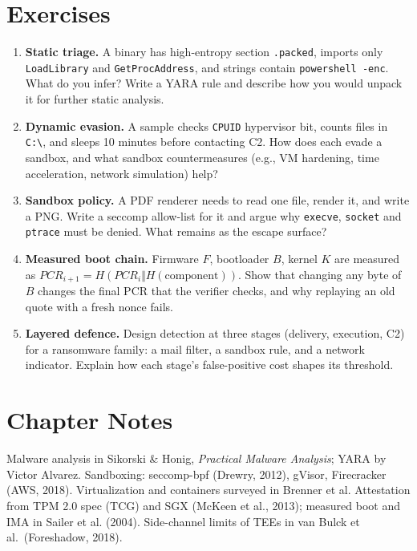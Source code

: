 \section{Exercises}
\label{sec:ch07-exercises}
{\sloppy
\begin{enumerate}[label=E7.\arabic*, leftmargin=*, itemsep=0.6em]
    \item \textbf{Static triage.} A binary has high-entropy section \texttt{.packed}, imports only \texttt{LoadLibrary} and \texttt{GetProcAddress}, and strings contain \texttt{powershell -enc}. What do you infer? Write a YARA rule and describe how you would unpack it for further static analysis.
    \item \textbf{Dynamic evasion.} A sample checks \texttt{CPUID} hypervisor bit, counts files in \texttt{C:\textbackslash}, and sleeps 10 minutes before contacting C2. How does each evade a sandbox, and what sandbox countermeasures (e.g., VM hardening, time acceleration, network simulation) help?
    \item \textbf{Sandbox policy.} A PDF renderer needs to read one file, render it, and write a PNG. Write a seccomp allow-list for it and argue why \texttt{execve}, \texttt{socket} and \texttt{ptrace} must be denied. What remains as the escape surface?
    \item \textbf{Measured boot chain.} Firmware $F$, bootloader $B$, kernel $K$ are measured as $PCR_{i+1}=H(PCR_i\Vert H(\text{component}))$. Show that changing any byte of $B$ changes the final PCR that the verifier checks, and why replaying an old quote with a fresh nonce fails.
    \item \textbf{Layered defence.} Design detection at three stages (delivery, execution, C2) for a ransomware family: a mail filter, a sandbox rule, and a network indicator. Explain how each stage's false-positive cost shapes its threshold.
\end{enumerate}
\par}

\section*{Chapter Notes}
Malware analysis in Sikorski \& Honig, \emph{Practical Malware Analysis}; YARA by Victor Alvarez. Sandboxing: seccomp-bpf (Drewry, 2012), gVisor, Firecracker (AWS, 2018). Virtualization and containers surveyed in Brenner et al. Attestation from TPM 2.0 spec (TCG) and SGX (McKeen et al., 2013); measured boot and IMA in Sailer et al. (2004). Side-channel limits of TEEs in van Bulck et al.~(Foreshadow, 2018).

